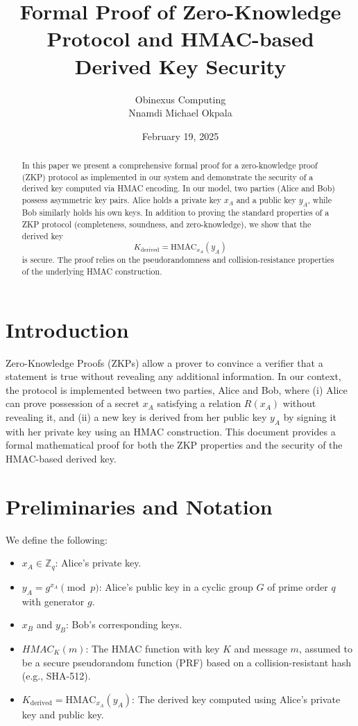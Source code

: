 \documentclass{article}
\title{Formal Proof of Zero-Knowledge Protocol and HMAC-based Derived Key Security}
\author{Obinexus Computing \\ Nnamdi Michael Okpala}
\date{February 19, 2025}
\begin{document}
\maketitle

\begin{abstract}
In this paper we present a comprehensive formal proof for a zero-knowledge proof (ZKP) protocol as implemented in our system and demonstrate the security of a derived key computed via HMAC encoding. In our model, two parties (Alice and Bob) possess asymmetric key pairs. Alice holds a private key \(x_A\) and a public key \(y_A\), while Bob similarly holds his own keys. In addition to proving the standard properties of a ZKP protocol (completeness, soundness, and zero-knowledge), we show that the derived key 
\[
K_{\text{derived}} = \mathrm{HMAC}_{x_A}(y_A)
\]
is secure. The proof relies on the pseudorandomness and collision-resistance properties of the underlying HMAC construction.
\end{abstract}

\section{Introduction}
Zero-Knowledge Proofs (ZKPs) allow a prover to convince a verifier that a statement is true without revealing any additional information. In our context, the protocol is implemented between two parties, Alice and Bob, where (i) Alice can prove possession of a secret \(x_A\) satisfying a relation \(R(x_A)\) without revealing it, and (ii) a new key is derived from her public key \(y_A\) by signing it with her private key using an HMAC construction. This document provides a formal mathematical proof for both the ZKP properties and the security of the HMAC-based derived key.

\section{Preliminaries and Notation}
We define the following:
\begin{itemize}
    \item \(x_A \in \mathbb{Z}_q\): Alice's private key.
    \item \(y_A = g^{x_A} \pmod{p}\): Alice's public key in a cyclic group \(G\) of prime order \(q\) with generator \(g\).
    \item \(x_B\) and \(y_B\): Bob's corresponding keys.
    \item \(HMAC_K(m)\): The HMAC function with key \(K\) and message \(m\), assumed to be a secure pseudorandom function (PRF) based on a collision-resistant hash (e.g., SHA-512).
    \item \(K_{\text{derived}} = \mathrm{HMAC}_{x_A}(y_A)\): The derived key computed using Alice’s private key and public key.
\end{itemize}
\end{document}
